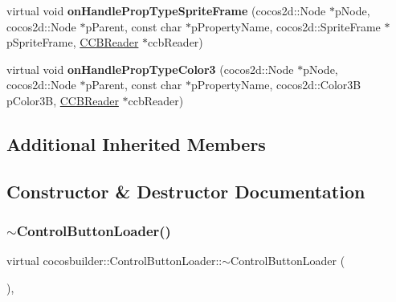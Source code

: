 \begin{DoxyCompactItemize}
\item 
\mbox{\label{classcocosbuilder_1_1ControlButtonLoader_a3d7e8bd2e6474214c2178ad29a89fc82}} 
virtual void {\bfseries on\+Handle\+Prop\+Type\+Sprite\+Frame} (cocos2d\+::\+Node $\ast$p\+Node, cocos2d\+::\+Node $\ast$p\+Parent, const char $\ast$p\+Property\+Name, cocos2d\+::\+Sprite\+Frame $\ast$p\+Sprite\+Frame, \hyperlink{classcocosbuilder_1_1CCBReader}{C\+C\+B\+Reader} $\ast$ccb\+Reader)
\item 
\mbox{\label{classcocosbuilder_1_1ControlButtonLoader_abdc03fc42c26b38d1c921c1b3a77af56}} 
virtual void {\bfseries on\+Handle\+Prop\+Type\+Color3} (cocos2d\+::\+Node $\ast$p\+Node, cocos2d\+::\+Node $\ast$p\+Parent, const char $\ast$p\+Property\+Name, cocos2d\+::\+Color3B p\+Color3B, \hyperlink{classcocosbuilder_1_1CCBReader}{C\+C\+B\+Reader} $\ast$ccb\+Reader)
\end{DoxyCompactItemize}
\subsection*{Additional Inherited Members}


\subsection{Constructor \& Destructor Documentation}
\mbox{\label{classcocosbuilder_1_1ControlButtonLoader_af233929bcb65b00911c14b948e23a7a6}} 
\subsubsection{\texorpdfstring{$\sim$\+Control\+Button\+Loader()}{~ControlButtonLoader()}\hspace{0.1cm}{\footnotesize\ttfamily [1/2]}}
{\footnotesize\ttfamily virtual cocosbuilder\+::\+Control\+Button\+Loader\+::$\sim$\+Control\+Button\+Loader (\begin{DoxyParamCaption}{ }\end{DoxyParamCaption})\hspace{0.3cm}{\ttfamily [inline]}, {\ttfamily [virtual]}}


